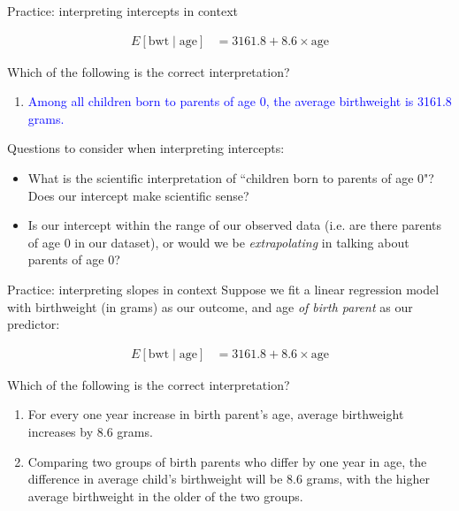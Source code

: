 \documentclass[10pt,t]{beamer}
\begin{document}
\begin{frame}{Practice: interpreting intercepts in context}


\begin{align*}
E[\text{bwt} \mid \text{age}] & = 3161.8 + 8.6 \times \text{age}
\end{align*}

Which of the following is the correct interpretation?

\vspace{0.3cm}

\begin{enumerate}
	\item[] \textcolor{blue}{Among all children born to parents of age $0$, the average birthweight is 3161.8 grams.}
\end{enumerate}

Questions to consider when interpreting intercepts:

\begin{itemize}
	\item What is the scientific interpretation of ``children born to parents of age 0"? Does our intercept make scientific sense?
	\item Is our intercept within the range of our observed data (i.e. are there parents of age $0$ in our dataset), or would we be \textit{extrapolating} in talking about parents of age $0$?
\end{itemize}

\end{frame}

\begin{frame}{Practice: interpreting slopes in context}
Suppose we fit a linear regression model with birthweight (in grams) as our outcome, and age \textit{of birth parent} as our predictor:

\begin{align*}
E[\text{bwt} \mid \text{age}] & = 3161.8 + 8.6 \times \text{age}
\end{align*}

Which of the following is the correct interpretation?

\begin{enumerate}
	\item For every one year increase in birth parent's age, average birthweight increases by 8.6 grams.
	\item Comparing two groups of birth parents who differ by one year in age, the difference in average child's birthweight will be 8.6 grams, with the higher average birthweight in the older of the two groups.
\end{enumerate}

\end{frame}
\end{document}
